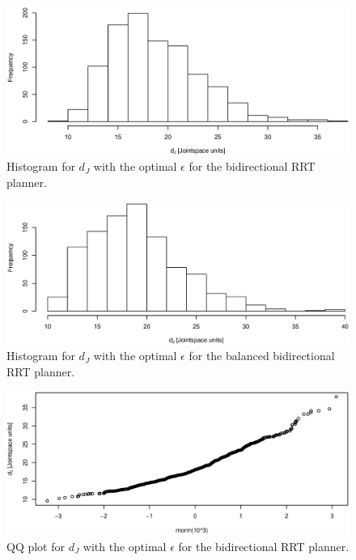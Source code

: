 \begin{figure}[h]
 \centering
 \includegraphics[width=\figsize]{graphics/hist_op_bi}
 \caption{Histogram for \(d_J\) with the optimal \(\epsilon\) for the bidirectional RRT planner.}
 \label{fig:balanced_correlated}
\end{figure}

\begin{figure}[h]
 \centering
 \includegraphics[width=\figsize]{graphics/hist_op_ba}
 \caption{Histogram for \(d_J\) with the optimal \(\epsilon\) for the balanced bidirectional RRT planner.}
 \label{fig:balanced_correlated}
\end{figure}

\begin{figure}[h]
 \centering
 \includegraphics[width=\figsize]{graphics/qq_op_bi}
 \caption{QQ plot for \(d_J\) with the optimal \(\epsilon\) for the bidirectional RRT planner.}
 \label{fig:balanced_correlated}
\end{figure}

